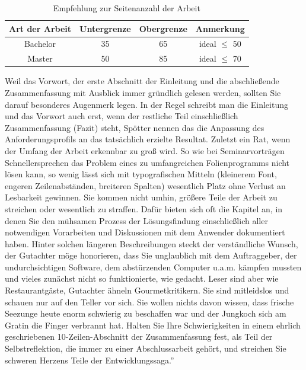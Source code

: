 \begin{table}[tb]
  \centering
  \begin{tabular}{cccc}
    \toprule
    \textbf{Art der Arbeit} & \textbf{Untergrenze} & \textbf{Obergrenze} & \textbf{Anmerkung} \\
		\midrule
    Bachelor & 35 & 65 & ideal $\leq$ 50 \\
    Master & 50 & 85 & ideal $\leq$ 70 \\
    \bottomrule
  \end{tabular}
  \caption{Empfehlung zur Seitenanzahl der Arbeit}
  \label{tab:tabelle-2}
\end{table}


Weil das Vorwort, der erste Abschnitt der Einleitung und die abschließende Zusammenfassung mit Ausblick immer gründlich gelesen werden, sollten Sie darauf besonderes Augenmerk
legen. In der Regel schreibt man die Einleitung und das Vorwort auch erst, wenn der restliche
Teil einschließlich Zusammenfassung (Fazit) steht, Spötter nennen das die Anpassung des
Anforderungsprofils an das tatsächlich erzielte Resultat.
Zuletzt ein Rat, wenn der Umfang der Arbeit erkennbar zu groß wird. So wie bei Seminarvorträgen Schnellersprechen das Problem eines zu umfangreichen Folienprogramms nicht
lösen kann, so wenig lässt sich mit typografischen Mitteln (kleinerem Font, engeren Zeilenabständen, breiteren Spalten) wesentlich Platz ohne Verlust an Lesbarkeit gewinnen. Sie kommen
nicht umhin, größere Teile der Arbeit zu streichen oder wesentlich zu straffen.
Dafür bieten sich oft die Kapitel an, in denen Sie den mühsamen Prozess der Lösungsfindung
einschließlich aller notwendigen Vorarbeiten und Diskussionen mit dem Anwender dokumentiert haben. Hinter solchen längeren Beschreibungen steckt der verständliche Wunsch, der Gutachter möge honorieren, dass Sie unglaublich mit dem Auftraggeber, der undurchsichtigen
Software, dem abstürzenden Computer u.a.m. kämpfen mussten und vieles zunächst nicht so
funktionierte, wie gedacht.
Leser sind aber wie Restaurantgäste, Gutachter ähneln Gourmetkritikern. Sie sind mitleidslos und schauen nur auf den Teller vor sich. Sie wollen nichts davon wissen, dass frische Seezunge heute enorm schwierig zu beschaffen war und der Jungkoch sich am Gratin die Finger
verbrannt hat. Halten Sie Ihre Schwierigkeiten in einem ehrlich geschriebenen 10-Zeilen-Abschnitt der Zusammenfassung fest, als Teil der Selbstreflektion, die immer zu einer
Abschlussarbeit gehört, und streichen Sie schweren Herzens Teile der Entwicklungssaga.''
